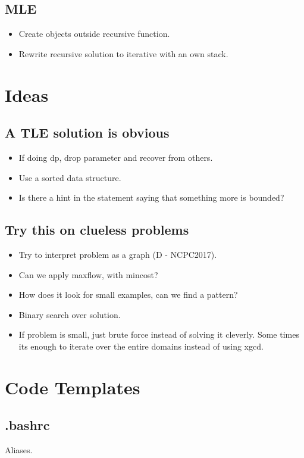 \documentclass[8pt,a4paper,landscape,oneside]{amsart}
\newcommand{\codeb}[1]{\inputminted[fontsize=\large,tabsize=2,baselinestretch=1]{bash}{code/#1}}
\begin{document}
\begin{multicols*}{2}
\begin{large}
    \subsection{MLE}
        \begin{itemize}
        \item Create objects outside recursive function.
        \item Rewrite recursive solution to iterative with an own stack.
        \end{itemize}
\section{Ideas}
    \subsection{A TLE solution is obvious}
        \begin{itemize}
        \item If doing dp, drop parameter and recover from others.
        \item Use a sorted data structure.
        \item Is there a hint in the statement saying that something more is bounded?
        \end{itemize}
    \subsection{Try this on clueless problems}
        \begin{itemize}
        \item Try to interpret problem as a graph (D - NCPC2017).
        \item Can we apply maxflow, with mincost?
        \item How does it look for small examples, can we find a pattern?
        \item Binary search over solution.
        \item If problem is small, just brute force instead of solving it cleverly.
            Some times its enough to iterate over the entire domains instead of using xgcd.
        \end{itemize}
\section{Code Templates}
    \subsection{.bashrc}
        Aliases.
        \codeb{.bashrc}

\end{large}
\end{multicols*}
\end{document}

